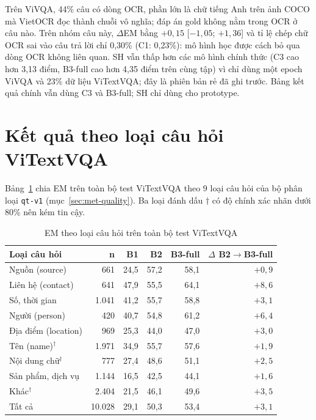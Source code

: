 Trên ViVQA, 44\% câu có dòng OCR, phần lớn là chữ tiếng Anh trên ảnh COCO mà
VietOCR đọc thành chuỗi vô nghĩa; đáp án gold không nằm trong OCR ở câu nào. Trên
nhóm câu này, $\Delta$EM bằng $+0{,}15$ [$-1{,}05$; $+1{,}36$] và tỉ lệ chép chữ
OCR sai vào câu trả lời chỉ 0,30\% (C1: 0,23\%): mô hình học được cách bỏ qua dòng
OCR không liên quan. SH vẫn thấp hơn các mô hình chính thức (C3 cao hơn 3,13 điểm,
B3-full cao hơn 4,35 điểm trên cùng tập) vì chỉ dùng một epoch ViVQA và 23\% dữ
liệu ViTextVQA; đây là phiên bản rẻ đã ghi trước. Bảng kết quả chính vẫn dùng C3
và B3-full; SH chỉ dùng cho prototype.

\section{Kết quả theo loại câu hỏi ViTextVQA}
\label{sec:res-qtype}

Bảng~\ref{tab:res-qtype} chia EM trên toàn bộ test ViTextVQA theo 9 loại câu hỏi
của bộ phân loại \texttt{qt-v1} (mục~\ref{sec:met-quality}). Ba loại đánh dấu
$\dagger$ có độ chính xác nhãn dưới 80\% nên kém tin cậy.

\begin{table}[htbp]
\caption{EM theo loại câu hỏi trên toàn bộ test ViTextVQA}
\label{tab:res-qtype}
\centering
\small
\begin{tabular}{p{}rrrrr}
\toprule
\textbf{Loại câu hỏi} & \textbf{n} & \textbf{B1} & \textbf{B2} & \textbf{B3-full} & \textbf{$\Delta$ B2$\to$B3-full} \\
\midrule
Nguồn (source) & 661 & 24,5 & 57,2 & 58,1 & $+0{,}9$ \\
Liên hệ (contact) & 641 & 47,9 & 55,5 & 64,1 & $+8{,}6$ \\
Số, thời gian & 1.041 & 41,2 & 55,7 & 58,8 & $+3{,}1$ \\
Người (person) & 420 & 40,7 & 54,8 & 61,2 & $+6{,}4$ \\
Địa điểm (location) & 969 & 25,3 & 44,0 & 47,0 & $+3{,}0$ \\
Tên (name)$^\dagger$ & 1.971 & 34,9 & 55,7 & 57,6 & $+1{,}9$ \\
Nội dung chữ$^\dagger$ & 777 & 27,4 & 48,6 & 51,1 & $+2{,}5$ \\
Sản phẩm, dịch vụ & 1.144 & 16,5 & 42,5 & 44,1 & $+1{,}6$ \\
Khác$^\dagger$ & 2.404 & 21,5 & 46,1 & 49,6 & $+3{,}5$ \\
\midrule
Tất cả & 10.028 & 29,1 & 50,3 & 53,4 & $+3{,}1$ \\
\bottomrule
\end{tabular}
\end{table}

